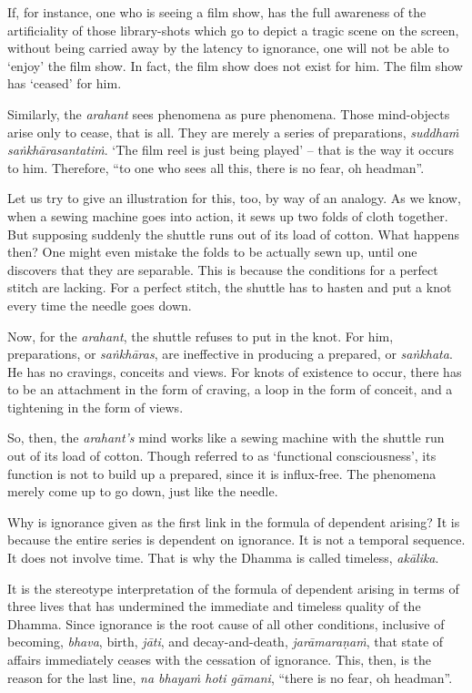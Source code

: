 If, for instance, one who is seeing a film show, has the full awareness of the artificiality of those library-shots which go to depict a tragic scene on the screen, without being carried away by the latency to ignorance, one will not be able to `enjoy' the film show. In fact, the film show does not exist for him. The film show has `ceased' for him.

Similarly, the \emph{arahant} sees phenomena as pure phenomena. Those mind-objects arise only to cease, that is all. They are merely a series of preparations, \emph{suddhaṁ saṅkhārasantatiṁ}. `The film reel is just being played' -- that is the way it occurs to him. Therefore, ``to one who sees all this, there is no fear, oh headman''.

Let us try to give an illustration for this, too, by way of an analogy. As we know, when a sewing machine goes into action, it sews up two folds of cloth together. But supposing suddenly the shuttle runs out of its load of cotton. What happens then? One might even mistake the folds to be actually sewn up, until one discovers that they are separable. This is because the conditions for a perfect stitch are lacking. For a perfect stitch, the shuttle has to hasten and put a knot every time the needle goes down.

Now, for the \emph{arahant}, the shuttle refuses to put in the knot. For him, preparations, or \emph{saṅkhāras}, are ineffective in producing a prepared, or \emph{saṅkhata}. He has no cravings, conceits and views. For knots of existence to occur, there has to be an attachment in the form of craving, a loop in the form of conceit, and a tightening in the form of views.

So, then, the \emph{arahant's} mind works like a sewing machine with the shuttle run out of its load of cotton. Though referred to as `functional consciousness', its function is not to build up a prepared, since it is influx-free. The phenomena merely come up to go down, just like the needle.

Why is ignorance given as the first link in the formula of dependent arising? It is because the entire series is dependent on ignorance. It is not a temporal sequence. It does not involve time. That is why the Dhamma is called timeless, \emph{akālika}.

It is the stereotype interpretation of the formula of dependent arising in terms of three lives that has undermined the immediate and timeless quality of the Dhamma. Since ignorance is the root cause of all other conditions, inclusive of becoming, \emph{bhava}, birth, \emph{jāti}, and decay-and-death, \emph{jarāmaraṇaṁ}, that state of affairs immediately ceases with the cessation of ignorance. This, then, is the reason for the last line, \emph{na bhayaṁ hoti gāmani}, ``there is no fear, oh headman''.

